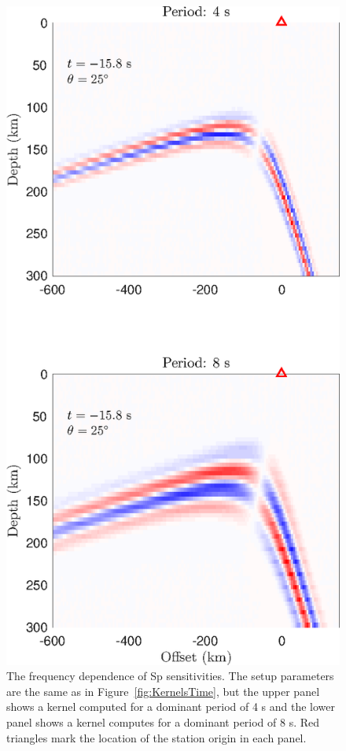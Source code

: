 \documentclass[referee]{gji}
\begin{document}
\begin{figure}
\centering
\includegraphics[]{img/figureFrequencyDependence.eps}
\caption{The frequency dependence of Sp sensitivities.  The setup parameters are the same as in Figure~\ref{fig:KernelsTime}, but the upper panel shows a kernel computed for a dominant period of 4 s and the lower panel shows a kernel computes for a dominant period of 8 s. Red triangles mark the location of the station origin in each panel.}
\label{fig:KernelsPeriod}
\end{figure}
\end{document}

